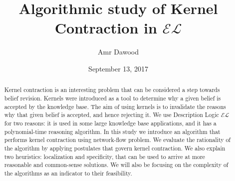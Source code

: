 \documentclass{sfuapproval}
\title{Algorithmic study of Kernel Contraction in $\mathcal{EL}$}
\author{Amr Dawood}
\date{September 13, 2017}
\theoremstyle{plain}
\theoremstyle{definition}
\begin{document}
\frontmatter
\maketitle{}
\makecommittee{}

\begin{abstract}
Kernel contraction is an interesting problem that can be considered a step towards belief revision. Kernels were introduced as a tool to determine why a given belief is accepted by the knowledge base. The aim of using kernels is to invalidate the reasons why that given belief is accepted, and hence rejecting it. We use Description Logic $\mathcal{EL}$ for two reasons: it is used in some large knowledge base applications, and it has a polynomial-time reasoning algorithm. In this study we introduce an algorithm that performs kernel contraction using network-flow problem. We evaluate the rationality of the algorithm by applying postulates that govern kernel contraction. We also explain two heuristics: localization and specificity, that can be used to arrive at more reasonable and common-sense solutions. We will also be focusing on the complexity of the algorithms as an indicator to their feasibility.
\end{abstract}


%
%

\tableofcontents\clearpage
{}\listoffigures





%
%

\mainmatter%
















\end{document}
